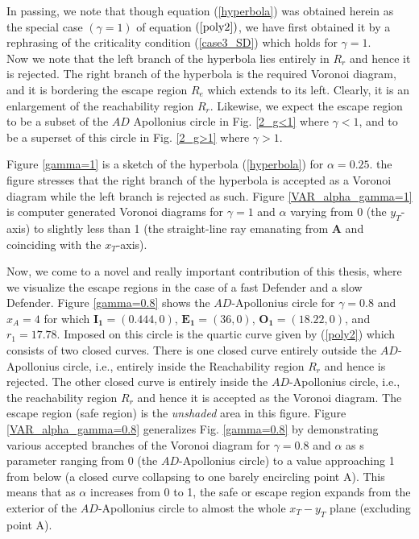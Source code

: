 In passing, we note that though equation (\ref{hyperbola}) was obtained herein as the special case $(\gamma=1)$ of equation $(\ref{poly2})$, we have first obtained it by a rephrasing of the criticality condition (\ref{case3_SD}) which holds for $\gamma=1$.\\


Now we note that the left branch of the hyperbola lies entirely in $R_{r}$ and hence it is rejected. The right branch of the hyperbola is the required Voronoi diagram, and it is bordering the escape region $R_{e}$ which extends to its left. Clearly, it is an enlargement of the reachability region $R_{r}$. Likewise, we expect the escape region to be a subset of the $AD$ Apollonius circle in Fig. \ref{2_g<1} where $\gamma<1$, and to be a superset of this circle in Fig. \ref{2_g>1} where $\gamma>1$.   

Figure \ref{gamma=1} is a sketch of the hyperbola (\ref{hyperbola}) for $\alpha=0.25$. the figure stresses that the right branch of the hyperbola is accepted as a Voronoi diagram while the left branch is rejected as such. Figure \ref{VAR_alpha_gamma=1} is computer generated Voronoi diagrams for $\gamma=1$ and $\alpha$ varying from 0 (the $y_T$-axis) to slightly less than 1 (the straight-line ray emanating from $\boldsymbol{A}$ and coinciding with the $x_T$-axis).

Now, we come to a novel and really important contribution of this thesis, where we visualize the escape regions in the case of a fast Defender and a slow Defender. Figure \ref{gamma=0.8} shows the $AD$-Apollonius circle for $\gamma=0.8$ and $x_A=4$ for which $\boldsymbol{I_1}=(0.444,0)$, $\boldsymbol{E_1}=(36,0)$, $\boldsymbol{O_1}=(18.22,0)$, and $r_1=17.78$. Imposed on this circle is the quartic curve given by (\ref{poly2}) which consists of two closed curves. There is one closed curve entirely outside the $AD$-Apollonius circle, i.e., entirely inside the Reachability region $R_r$ and hence is rejected. The other closed curve is entirely inside the $AD$-Apollonius circle, i.e., the reachability region $R_r$ and hence it is accepted as the Voronoi diagram. The escape region (safe region) is the \textit{unshaded} area in this figure. Figure \ref{VAR_alpha_gamma=0.8} generalizes Fig. \ref{gamma=0.8} by demonstrating various accepted branches of the Voronoi diagram for $\gamma=0.8$ and $\alpha$ as s parameter ranging from 0 (the $AD$-Apollonius circle) to a value approaching 1 from below (a closed curve collapsing to one barely encircling point A). This means that as $\alpha$ increases from 0 to 1, the safe or escape region expands from the exterior of the $AD$-Apollonius circle to almost the whole $x_T-y_T$ plane (excluding point A).


